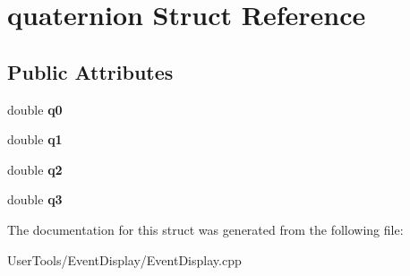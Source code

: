 \hypertarget{structquaternion}{
\section{quaternion Struct Reference}
\label{structquaternion}
}
\subsection*{Public Attributes}
\begin{DoxyCompactItemize}
\item 
\hypertarget{structquaternion_a70001dd0b39421c936b6d20e15471b3d}{
double {\bfseries q0}}
\label{structquaternion_a70001dd0b39421c936b6d20e15471b3d}

\item 
\hypertarget{structquaternion_abbdc170dc2ac800c39fab9aa9f99d3ce}{
double {\bfseries q1}}
\label{structquaternion_abbdc170dc2ac800c39fab9aa9f99d3ce}

\item 
\hypertarget{structquaternion_a7af6afcba00a35e14ab605b11223b83c}{
double {\bfseries q2}}
\label{structquaternion_a7af6afcba00a35e14ab605b11223b83c}

\item 
\hypertarget{structquaternion_ad6a829c1635921b61464c75903b71dc8}{
double {\bfseries q3}}
\label{structquaternion_ad6a829c1635921b61464c75903b71dc8}

\end{DoxyCompactItemize}


The documentation for this struct was generated from the following file:\begin{DoxyCompactItemize}
\item 
UserTools/EventDisplay/EventDisplay.cpp\end{DoxyCompactItemize}
